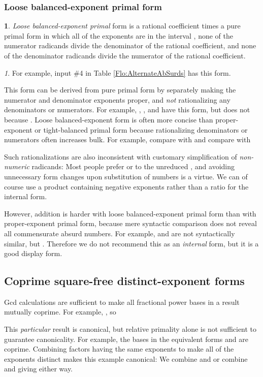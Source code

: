 \documentclass[12pt,english]{article}
\theoremstyle{definition}
\newtheorem*{defn*}{\protect\definitionname}
\theoremstyle{remark}
\newtheorem*{rem*}{\protect\remarkname}
\theoremstyle{plain}
\theoremstyle{plain}
\providecommand{\definitionname}{Definition}
\providecommand{\remarkname}{Remark}
\begin{document}
\subsubsection{Loose balanced-exponent primal form\emph{\vspace{0.3em}
}}
\begin{defn*}
\textsl{Loose balanced-exponent primal} form is a rational coefficient
times a pure primal form in which all of the exponents are in the
interval  , none of the numerator radicands divide the denominator
of the rational coefficient, and none of the denominator radicands
divide the numerator of the rational coefficient.\end{defn*}
\begin{rem*}
For example, input \#4 in Table \ref{Flo:AlternateAbSurds} has this
form.
\end{rem*}
This form can be derived from pure primal form by separately making
the numerator and denominator exponents proper, and \textsl{not} rationalizing
any denominators or numerators. For example, , ,
and  have this form, but 
does not because . Loose balanced-exponent form is
often more concise than proper-exponent or tight-balanced primal form
because rationalizing denominators or numerators often increases bulk.
For example, compare  with 
and compare  with

 Such rationalizations are also inconsistent with customary simplification
of \textsl{non-numeric} radicands: Most people prefer 
or  to the unreduced , and avoiding unnecessary
form changes upon substitution of numbers is a virtue. We can of course
use a product containing negative exponents rather than a ratio for
the internal form.

However, addition is harder with loose balanced-exponent primal form
than with proper-exponent primal form, because mere syntactic comparison
does not reveal all commensurate absurd numbers. For example, 
and  are not syntactically similar, but 
. Therefore we do not recommend this as an \textsl{internal} form,
but it is a good display form.


\subsection{Coprime square-free distinct-exponent forms}

Gcd calculations are sufficient to make all fractional power bases
in a result mutually coprime. For example, ,
so



This \textsl{particular} result is canonical, but relative primality
alone is not sufficient to guarantee canonicality. For example, the
bases in the equivalent forms  and 
are coprime. Combining factors having the same exponents to make all
of the exponents distinct makes this example canonical: We combine
 and  or combine  and  giving
 either way.
\end{document}
